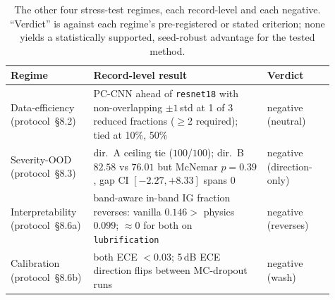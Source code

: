 \begin{table}[t]
  \centering
  \caption{The other four stress-test regimes, each record-level and each
    negative. ``Verdict'' is against each regime's pre-registered or stated
    criterion; none yields a statistically supported, seed-robust advantage for
    the tested method.}
  \label{tab:regimes}
  \begin{tabular}{>{\raggedright\arraybackslash}p{0.19\linewidth}%
                  >{\raggedright\arraybackslash}p{0.52\linewidth}%
                  >{\raggedright\arraybackslash}p{0.20\linewidth}}
    \toprule
    Regime & Record-level result & Verdict \\
    \midrule
    Data-efficiency (protocol~\S8.2) &
      PC-CNN ahead of \texttt{resnet18} with non-overlapping $\pm1$\,std at 1 of
      3 reduced fractions ($\ge$2 required); tied at 10\%, 50\% &
      negative (neutral) \\
    \addlinespace
    Severity-OOD (protocol~\S8.3) &
      dir.\ A ceiling tie ($100$/$100$); dir.\ B $82.58$ vs $76.01$ but McNemar
      $p=0.39$, gap CI $[-2.27,+8.33]$ spans 0 &
      negative (direction-only) \\
    \addlinespace
    Interpretability (protocol~\S8.6a) &
      band-aware in-band IG fraction reverses: vanilla $0.146 >$ physics
      $0.099$; $\approx$0 for both on \texttt{lubrification} &
      negative (reverses) \\
    \addlinespace
    Calibration (protocol~\S8.6b) &
      both ECE $<0.03$; 5\,dB ECE direction flips between MC-dropout runs &
      negative (wash) \\
    \bottomrule
  \end{tabular}
\end{table}
